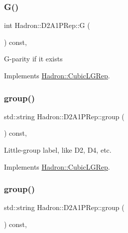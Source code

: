 \subsubsection{\texorpdfstring{G()}{G()}\hspace{0.1cm}{\footnotesize\ttfamily [2/2]}}
{\footnotesize\ttfamily int Hadron\+::\+D2\+A1\+P\+Rep\+::G (\begin{DoxyParamCaption}{ }\end{DoxyParamCaption}) const\hspace{0.3cm}{\ttfamily [inline]}, {\ttfamily [virtual]}}

G-\/parity if it exists 

Implements \mbox{\hyperlink{structHadron_1_1CubicLGRep_ace26f7b2d55e3a668a14cb9026da5231}{Hadron\+::\+Cubic\+L\+G\+Rep}}.

\mbox{\label{structHadron_1_1D2A1PRep_a202c6828bea0a6048053c70ddf7ea474}} 
\subsubsection{\texorpdfstring{group()}{group()}\hspace{0.1cm}{\footnotesize\ttfamily [1/2]}}
{\footnotesize\ttfamily std\+::string Hadron\+::\+D2\+A1\+P\+Rep\+::group (\begin{DoxyParamCaption}{ }\end{DoxyParamCaption}) const\hspace{0.3cm}{\ttfamily [inline]}, {\ttfamily [virtual]}}

Little-\/group label, like D2, D4, etc. 

Implements \mbox{\hyperlink{structHadron_1_1CubicLGRep_a9bdb14b519a611d21379ed96a3a9eb41}{Hadron\+::\+Cubic\+L\+G\+Rep}}.

\mbox{\label{structHadron_1_1D2A1PRep_a202c6828bea0a6048053c70ddf7ea474}} 
\subsubsection{\texorpdfstring{group()}{group()}\hspace{0.1cm}{\footnotesize\ttfamily [2/2]}}
{\footnotesize\ttfamily std\+::string Hadron\+::\+D2\+A1\+P\+Rep\+::group (\begin{DoxyParamCaption}{ }\end{DoxyParamCaption}) const\hspace{0.3cm}{\ttfamily [inline]}, {\ttfamily [virtual]}}


